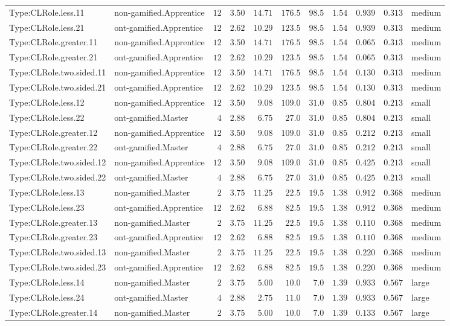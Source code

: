 \documentclass[6pt,a4paper]{article}
\begin{document}
{\begin{longtable}{llrrrrrrrrl}
Type:CLRole.less.11&non-gamified.Apprentice&$12$&$3.50$&$14.71$&$176.5$&$ 98.5$&$ 1.54$&$0.939$&$0.313$&medium\tabularnewline
Type:CLRole.less.21&ont-gamified.Apprentice&$12$&$2.62$&$10.29$&$123.5$&$ 98.5$&$ 1.54$&$0.939$&$0.313$&medium\tabularnewline
Type:CLRole.greater.11&non-gamified.Apprentice&$12$&$3.50$&$14.71$&$176.5$&$ 98.5$&$ 1.54$&$0.065$&$0.313$&medium\tabularnewline
Type:CLRole.greater.21&ont-gamified.Apprentice&$12$&$2.62$&$10.29$&$123.5$&$ 98.5$&$ 1.54$&$0.065$&$0.313$&medium\tabularnewline
Type:CLRole.two.sided.11&non-gamified.Apprentice&$12$&$3.50$&$14.71$&$176.5$&$ 98.5$&$ 1.54$&$0.130$&$0.313$&medium\tabularnewline
Type:CLRole.two.sided.21&ont-gamified.Apprentice&$12$&$2.62$&$10.29$&$123.5$&$ 98.5$&$ 1.54$&$0.130$&$0.313$&medium\tabularnewline
Type:CLRole.less.12&non-gamified.Apprentice&$12$&$3.50$&$ 9.08$&$109.0$&$ 31.0$&$ 0.85$&$0.804$&$0.213$&small\tabularnewline
Type:CLRole.less.22&ont-gamified.Master&$ 4$&$2.88$&$ 6.75$&$ 27.0$&$ 31.0$&$ 0.85$&$0.804$&$0.213$&small\tabularnewline
Type:CLRole.greater.12&non-gamified.Apprentice&$12$&$3.50$&$ 9.08$&$109.0$&$ 31.0$&$ 0.85$&$0.212$&$0.213$&small\tabularnewline
Type:CLRole.greater.22&ont-gamified.Master&$ 4$&$2.88$&$ 6.75$&$ 27.0$&$ 31.0$&$ 0.85$&$0.212$&$0.213$&small\tabularnewline
Type:CLRole.two.sided.12&non-gamified.Apprentice&$12$&$3.50$&$ 9.08$&$109.0$&$ 31.0$&$ 0.85$&$0.425$&$0.213$&small\tabularnewline
Type:CLRole.two.sided.22&ont-gamified.Master&$ 4$&$2.88$&$ 6.75$&$ 27.0$&$ 31.0$&$ 0.85$&$0.425$&$0.213$&small\tabularnewline
Type:CLRole.less.13&non-gamified.Master&$ 2$&$3.75$&$11.25$&$ 22.5$&$ 19.5$&$ 1.38$&$0.912$&$0.368$&medium\tabularnewline
Type:CLRole.less.23&ont-gamified.Apprentice&$12$&$2.62$&$ 6.88$&$ 82.5$&$ 19.5$&$ 1.38$&$0.912$&$0.368$&medium\tabularnewline
Type:CLRole.greater.13&non-gamified.Master&$ 2$&$3.75$&$11.25$&$ 22.5$&$ 19.5$&$ 1.38$&$0.110$&$0.368$&medium\tabularnewline
Type:CLRole.greater.23&ont-gamified.Apprentice&$12$&$2.62$&$ 6.88$&$ 82.5$&$ 19.5$&$ 1.38$&$0.110$&$0.368$&medium\tabularnewline
Type:CLRole.two.sided.13&non-gamified.Master&$ 2$&$3.75$&$11.25$&$ 22.5$&$ 19.5$&$ 1.38$&$0.220$&$0.368$&medium\tabularnewline
Type:CLRole.two.sided.23&ont-gamified.Apprentice&$12$&$2.62$&$ 6.88$&$ 82.5$&$ 19.5$&$ 1.38$&$0.220$&$0.368$&medium\tabularnewline
Type:CLRole.less.14&non-gamified.Master&$ 2$&$3.75$&$ 5.00$&$ 10.0$&$  7.0$&$ 1.39$&$0.933$&$0.567$&large\tabularnewline
Type:CLRole.less.24&ont-gamified.Master&$ 4$&$2.88$&$ 2.75$&$ 11.0$&$  7.0$&$ 1.39$&$0.933$&$0.567$&large\tabularnewline
Type:CLRole.greater.14&non-gamified.Master&$ 2$&$3.75$&$ 5.00$&$ 10.0$&$  7.0$&$ 1.39$&$0.133$&$0.567$&large\tabularnewline

\end{longtable}}
\end{document}
